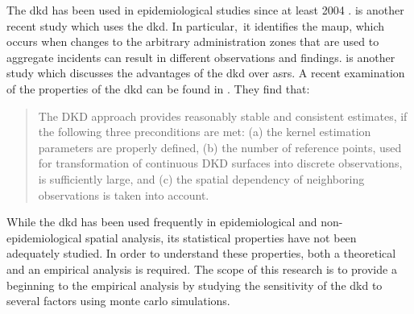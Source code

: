 The \acrfull{dkd} has been used in epidemiological studies since at least 2004 \citep{rushton2004analyzing}.
\citet{kloog2009using} is another recent study which uses the \gls{dkd}.
In particular,\
it identifies the \gls{maup},
which occurs when changes to the arbitrary administration zones that are used to aggregate incidents can result in different observations and findings.
\citet{zusman2012residential} is another study which discusses the advantages of the \gls{dkd} over \glspl{asr}.
A recent examination of the properties of the \gls{dkd} can be found in \citet{zusman2016application}.
They find that:
\begin{quotation}
The DKD approach provides reasonably stable and consistent estimates, if the following three preconditions are met: (a) the kernel estimation parameters are properly defined, (b) the number of reference points, used for transformation of continuous DKD surfaces into discrete observations, is sufficiently large, and (c) the spatial dependency of neighboring observations is taken into account.
\end{quotation}


While the \gls{dkd} has been used frequently in epidemiological and non-epidemiological spatial analysis,
its statistical properties have not been adequately studied.
In order to understand these properties,
both a theoretical and an empirical analysis is required.
The scope of this research is to provide a beginning to the empirical analysis by studying the sensitivity of the \gls{dkd} to several factors using monte carlo simulations.

